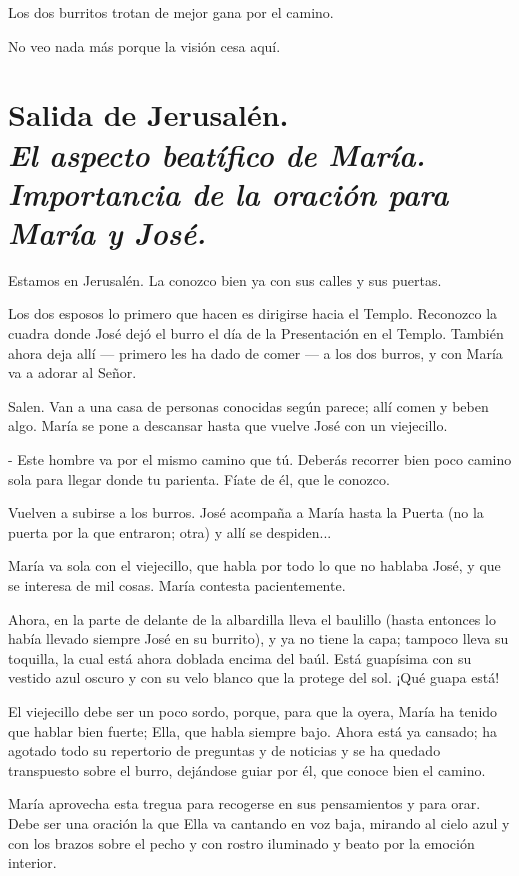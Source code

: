 \documentclass[12pt, twoside, openright]{book} %
\begin{document}
Los dos burritos trotan de mejor gana por el camino. 

No veo nada más porque la visión cesa aquí. 

\chapter*{Salida de Jerusalén. \\ \normalfont\normalsize\textit{El aspecto beatífico de María. Importancia de la oración para María y José.}}

Estamos en Jerusalén. La conozco bien ya con sus calles y sus puertas. 

Los dos esposos lo primero que hacen es dirigirse hacia el Templo. Reconozco la cuadra donde José dejó el burro el día de la Presentación en el Templo. También ahora deja allí — primero les ha dado de comer — a los dos burros, y con María va a adorar al Señor. 

Salen. Van a una casa de personas conocidas según parece; allí comen y beben algo. María se pone a descansar hasta que vuelve José con un viejecillo. 

- Este hombre va por el mismo camino que tú. Deberás recorrer bien poco camino sola para llegar donde tu parienta. Fíate de él, que le conozco. 

Vuelven a subirse a los burros. José acompaña a María hasta la Puerta (no la puerta por la que entraron; otra) y allí se despiden... 

María va sola con el viejecillo, que habla por todo lo que no hablaba José, y que se interesa de mil cosas. María contesta pacientemente. 

Ahora, en la parte de delante de la albardilla lleva el baulillo (hasta entonces lo había llevado siempre José en su burrito), y ya no tiene la capa; tampoco lleva su toquilla, la cual está ahora doblada encima del baúl. Está guapísima con su vestido azul oscuro y con su velo blanco que la protege del sol. ¡Qué guapa está! 

El viejecillo debe ser un poco sordo, porque, para que la oyera, María ha tenido que hablar bien fuerte; Ella, que habla siempre bajo. Ahora está ya cansado; ha agotado todo su repertorio de preguntas y de noticias y se ha quedado transpuesto sobre el burro, dejándose guiar por él, que conoce bien el camino. 

María aprovecha esta tregua para recogerse en sus pensamientos y para orar. Debe ser una oración la que Ella va cantando en voz baja, mirando al cielo azul y con los brazos sobre el pecho y con rostro iluminado y beato por la emoción interior. 
\end{document}
